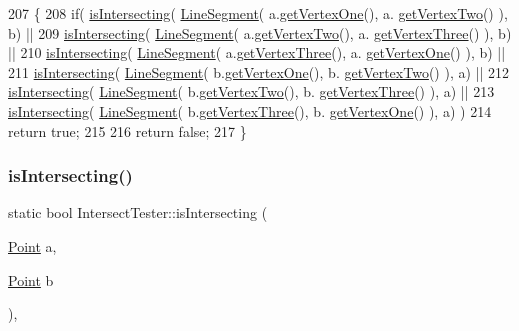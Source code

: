 \begin{DoxyCode}
207 \{
208     \textcolor{keywordflow}{if}( \hyperlink{class_intersect_tester_a7710e17ff7d2e229059f23b9429213f5}{isIntersecting}( \hyperlink{class_line_segment}{LineSegment}( a.\hyperlink{class_triangle_a88a35d0b66c9636a9be88adc88d003aa}{getVertexOne}(), a.
      \hyperlink{class_triangle_ac1ae7463f829bcf377fd926b1ad10cac}{getVertexTwo}() ), b) ||
209         \hyperlink{class_intersect_tester_a7710e17ff7d2e229059f23b9429213f5}{isIntersecting}( \hyperlink{class_line_segment}{LineSegment}( a.\hyperlink{class_triangle_ac1ae7463f829bcf377fd926b1ad10cac}{getVertexTwo}(), a.
      \hyperlink{class_triangle_aed6ceca804b35da95d3d3c930de41e91}{getVertexThree}() ), b) ||
210         \hyperlink{class_intersect_tester_a7710e17ff7d2e229059f23b9429213f5}{isIntersecting}( \hyperlink{class_line_segment}{LineSegment}( a.\hyperlink{class_triangle_aed6ceca804b35da95d3d3c930de41e91}{getVertexThree}(), a.
      \hyperlink{class_triangle_a88a35d0b66c9636a9be88adc88d003aa}{getVertexOne}() ), b) ||
211         \hyperlink{class_intersect_tester_a7710e17ff7d2e229059f23b9429213f5}{isIntersecting}( \hyperlink{class_line_segment}{LineSegment}( b.\hyperlink{class_triangle_a88a35d0b66c9636a9be88adc88d003aa}{getVertexOne}(), b.
      \hyperlink{class_triangle_ac1ae7463f829bcf377fd926b1ad10cac}{getVertexTwo}() ), a) ||
212         \hyperlink{class_intersect_tester_a7710e17ff7d2e229059f23b9429213f5}{isIntersecting}( \hyperlink{class_line_segment}{LineSegment}( b.\hyperlink{class_triangle_ac1ae7463f829bcf377fd926b1ad10cac}{getVertexTwo}(), b.
      \hyperlink{class_triangle_aed6ceca804b35da95d3d3c930de41e91}{getVertexThree}() ), a) ||
213         \hyperlink{class_intersect_tester_a7710e17ff7d2e229059f23b9429213f5}{isIntersecting}( \hyperlink{class_line_segment}{LineSegment}( b.\hyperlink{class_triangle_aed6ceca804b35da95d3d3c930de41e91}{getVertexThree}(), b.
      \hyperlink{class_triangle_a88a35d0b66c9636a9be88adc88d003aa}{getVertexOne}() ), a) )
214         \textcolor{keywordflow}{return} \textcolor{keyword}{true};
215 
216     \textcolor{keywordflow}{return} \textcolor{keyword}{false};
217 \}
\end{DoxyCode}
\mbox{\label{class_intersect_tester_a7710e17ff7d2e229059f23b9429213f5}} 
\subsubsection{\texorpdfstring{is\+Intersecting()}{isIntersecting()}\hspace{0.1cm}{\footnotesize\ttfamily [1/15]}}
{\footnotesize\ttfamily static bool Intersect\+Tester\+::is\+Intersecting (\begin{DoxyParamCaption}\item[{\hyperlink{class_point}{Point}}]{a,  }\item[{\hyperlink{class_point}{Point}}]{b }\end{DoxyParamCaption})\hspace{0.3cm}{\ttfamily [inline]}, {\ttfamily [static]}}



